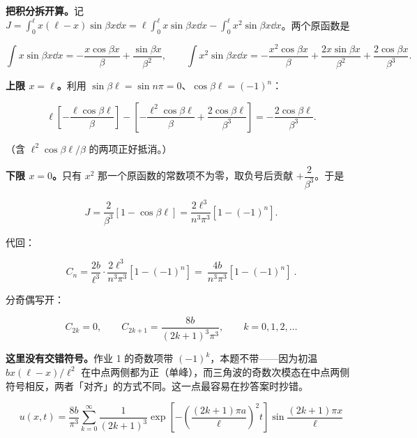 \textbf{把积分拆开算。}记 $J=\int_0^{\ell}x(\ell-x)\sin\beta x\dd x=\ell\int_0^\ell x\sin\beta x\dd x-\int_0^\ell x^2\sin\beta x\dd x$。两个原函数是

\[
\int x\sin\beta x\dd x=-\frac{x\cos\beta x}{\beta}+\frac{\sin\beta x}{\beta^2},
\qquad
\int x^2\sin\beta x\dd x=-\frac{x^2\cos\beta x}{\beta}+\frac{2x\sin\beta x}{\beta^2}+\frac{2\cos\beta x}{\beta^3}.
\]

\textbf{上限 $x=\ell$。}利用 $\sin\beta\ell=\sin n\pi=0$、$\cos\beta\ell=(-1)^n$：

\[
\ell\left[-\frac{\ell\cos\beta\ell}{\beta}\right]-\left[-\frac{\ell^2\cos\beta\ell}{\beta}+\frac{2\cos\beta\ell}{\beta^3}\right]
=-\frac{2\cos\beta\ell}{\beta^3}.
\]

（含 $\ell^2\cos\beta\ell/\beta$ 的两项正好抵消。）

\textbf{下限 $x=0$。}只有 $x^2$ 那一个原函数的常数项不为零，取负号后贡献 $+\dfrac{2}{\beta^3}$。于是

\[
J=\frac{2}{\beta^3}\left[1-\cos\beta\ell\right]
=\frac{2\ell^3}{n^3\pi^3}\left[1-(-1)^n\right].
\]

代回：

\[
C_n=\frac{2b}{\ell^3}\cdot\frac{2\ell^3}{n^3\pi^3}\left[1-(-1)^n\right]
=\boxed{\ \frac{4b}{n^3\pi^3}\left[1-(-1)^n\right]\ }.
\]

分奇偶写开：

\[
C_{2k}=0,
\qquad
C_{2k+1}=\frac{8b}{(2k+1)^3\pi^3},
\qquad k=0,1,2,\dots
\]

\textbf{这里没有交错符号。}作业 1 的奇数项带 $(-1)^k$，本题不带——因为初温 $bx(\ell-x)/\ell^2$ 在中点两侧都为正（单峰），而三角波的奇数次模态在中点两侧符号相反，两者「对齐」的方式不同。这一点最容易在抄答案时抄错。


\[
\boxed{\;
u(x,t)=\frac{8b}{\pi^3}\sum_{k=0}^{\infty}\frac{1}{(2k+1)^3}
\exp\left[-\left(\frac{(2k+1)\pi a}{\ell}\right)^2t\right]
\sin\frac{(2k+1)\pi x}{\ell}
\;}
\]


